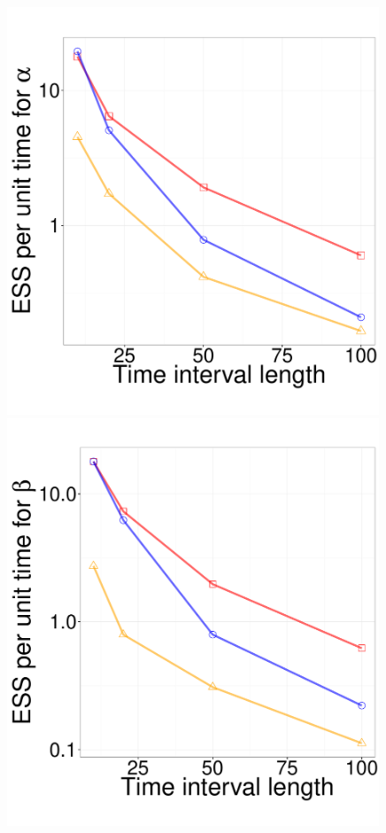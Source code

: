 {\begin{figure}
\begin{minipage}[hp]{0.24\linewidth}
  \end{minipage}
  \begin{minipage}[hp]{0.24\linewidth}
  \centering
    \includegraphics [width=0.99\textwidth, angle=0]{figures_new_apr12/alpha_ESS_T_nonfix_18apr27.pdf}
      \end{minipage}
  \begin{minipage}[hp]{0.24\linewidth}
  \centering
    \includegraphics [width=0.99\textwidth, angle=0]{figures_new_apr12/beta_ESS_T_nonfix_18apr27.pdf}

\end{minipage}
\end{figure}}
